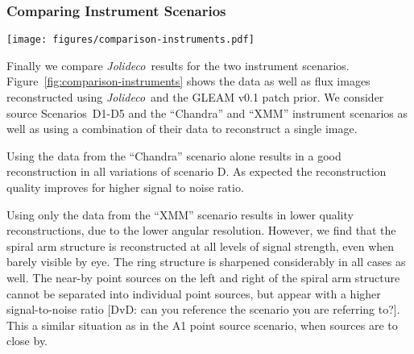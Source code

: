 \documentclass[twocolumn]{aastex631}
\newcommand{\jolideco}{\textit{Jolideco}~}
\newcommand{\dvd}[1]{{\color{red} [DvD: #1]}}
\begin{document}
    \subsubsection{Comparing Instrument Scenarios}
    \begin{figure*}
        \begin{centering}
            \texttt{[image: figures/comparison-instruments.pdf]}
            \caption{
                Comparison of \jolideco with the GLEAM v0.1 prior for the different instrument scenarios. The images are grouped by instrument scenario with each pair of columns showing the counts data in the left column and the reconstruction in the right column. The rows show the scenarios D1-D5 as described in Section\ref{subsec:test-datasets}. 
                All results are available at \url{https://jolideco.github.io/jolideco-comparison}.
            }
            \label{fig:comparison-instruments}
        \end{centering}
    \end{figure*}
    Finally we compare \jolideco results  for the two instrument scenarios. Figure~\ref{fig:comparison-instruments} shows the data as well as flux images reconstructed using \jolideco and the GLEAM v0.1 patch prior. We consider source Scenarios~D1-D5 and the  \enquote{Chandra} and \enquote{XMM} instrument scenarios as well as using a combination of their data to reconstruct a single image. 

    Using the data from the \enquote{Chandra} scenario alone results in a good reconstruction in all variations of scenario D. As expected the reconstruction quality improves for higher signal to noise ratio. 
    
    Using only the data from the \enquote{XMM} scenario results in lower quality reconstructions, due to the lower angular resolution. However, we find that the spiral arm structure is reconstructed at all levels of signal strength, even when barely visible by eye. The ring structure is sharpened considerably in all cases as well. The near-by point sources on the left and right of the spiral arm structure cannot be separated into individual point sources, but appear with a higher signal-to-noise ratio \dvd{can you reference the scenario you are referring to?}.  This a similar situation as in the A1 point source scenario, when sources are to close by.
    
\end{document}
